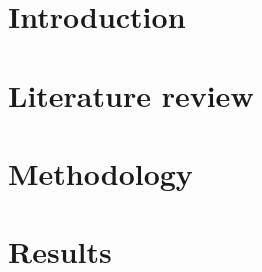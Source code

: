 \documentclass[11pt,a4paper]{article}
\begin{document}
\newpage

\tableofcontents
{}
\newpage
\setcounter{page}{1}

\section{Introduction}\label{sec:intro}

\lipsum[1-2]

\section{Literature review}\label{sec:lit-rev}

\lipsum[3-4]\cite{einstein}

\section{Methodology}\label{sec:meth}

\lipsum[5-6]\cite{latexcompanion}

\section{Results}\label{sec:res}

\lipsum[7-8]\cite{knuthwebsite}



\end{document}
